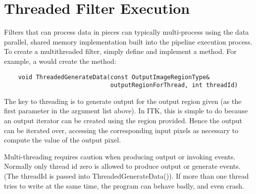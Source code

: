 \section{Threaded Filter Execution}
\label{sec:ThreadedFilterExecution}

Filters that can process data in pieces can typically multi-process using the
data parallel, shared memory implementation built into the pipeline execution
process. To create a multithreaded filter, simply define and implement a
 method. For example, a 
would create the method:

\small
\begin{verbatim}
    void ThreadedGenerateData(const OutputImageRegionType& 
                              outputRegionForThread, int threadId)
\end{verbatim}
\normalsize

The key to threading is to generate output for the output region given (as
the first parameter in the argument list above). In ITK, this is simple to do
because an output iterator can be created using the region provided. Hence
the output can be iterated over, accessing the corresponding input pixels as
necessary to compute the value of the output pixel.

Multi-threading requires caution when producing output or invoking
events. Normally only thread id zero is allowed to produce output or generate
events. (The threadId is passed into ThreadedGenerateData()). If more than
one thread tries to write at the same time, the program can behave badly, and
even crash.

